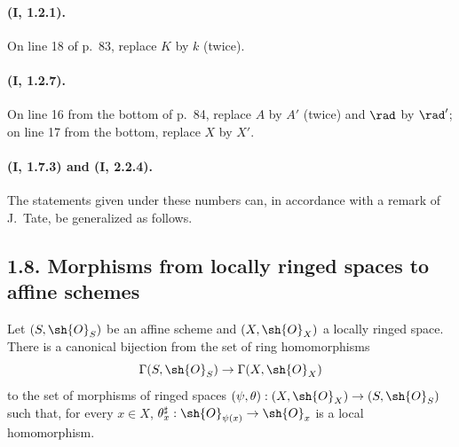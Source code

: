 \paragraph{(I, 1.2.1).}
On line 18 of p.~83, replace $K$ by $k$ (twice).

\paragraph{(I, 1.2.7).}
On line 16 from the bottom of p.~84, replace $A$ by $A'$ (twice) and
$\rad$ by $\rad'$; on line 17 from the bottom, replace
$X$ by $X'$.

\paragraph{(I, 1.7.3) and (I, 2.2.4).}
The statements given under these numbers can, in accordance with a
remark of J.~Tate, be generalized as follows.

\subsection*{1.8. Morphisms from locally ringed spaces to affine schemes}
\label{ega2:addendum:subsection:I.1.8}

\begin{proposition}[1.8.1]
\label{ega2:addendum:I.1.8.1}
Let $(S,\sh{O}_S)$ be an affine scheme and $(X,\sh{O}_X)$ a locally
ringed space.  There is a canonical bijection from the set of ring
homomorphisms
\[
  \Gamma(S,\sh{O}_S)\to\Gamma(X,\sh{O}_X)
\]
to the set of morphisms of ringed spaces
$(\psi,\theta):(X,\sh{O}_X)\to(S,\sh{O}_S)$ such that, for every
$x\in X$, $\theta_x^\sharp:\sh{O}_{\psi(x)}\to\sh{O}_x$ is a local
homomorphism.
\end{proposition}

